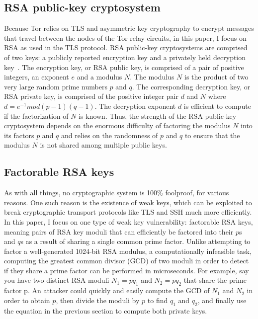 \subsection{RSA public-key cryptosystem}
Because Tor relies on TLS and asymmetric key cryptography to encrypt messages that travel between the nodes of the Tor relay circuits, in this paper, I focus on RSA as used in the TLS protocol. RSA public-key cryptosystems are comprised of two keys: a publicly reported encryption key and a privately held decryption key~\cite{rivest1978method}. The encryption key, or RSA public key, is comprised of a pair of positive integers, an exponent $e$ and a modulus $N$. The modulus $N$ is the product of two very large random prime numbers $p$ and $q$. The corresponding decryption key, or RSA private key, is comprised of the positive integer pair $d$ and $N$ where $d = e^{-1} mod (p - 1)(q - 1)$. The decryption exponent $d$ is efficient to compute if the factorization of $N$ is known. Thus, the strength of the RSA public-key cryptosystem depends on the enormous difficulty of factoring the modulus $N$ into its factors $p$ and $q$ and relies on the randomness of $p$ and $q$ to ensure that the modulus $N$ is not shared among multiple public keys.

\subsection{Factorable RSA keys}
As with all things, no cryptographic system is 100\% foolproof, for various reasons. One such reason is the existence of weak keys, which can be exploited to break cryptographic transport protocols like TLS and SSH much more efficiently. In this paper, I focus on one type of weak key vulnerability: factorable RSA keys, meaning pairs of RSA key moduli that can efficiently be factored into their $p$s and $q$s as a result of sharing a single common prime factor. Unlike attempting to factor a well-generated 1024-bit RSA modulus, a computationally infeasible task, computing the greatest common divisor (GCD) of two moduli in order to detect if they share a prime factor can be performed in microseconds. For example, say you have two distinct RSA moduli $N_1 = pq_1$ and $N_2 = pq_2$ that share the prime factor p. An attacker could quickly and easily compute the GCD of $N_1$ and $N_2$ in order to obtain $p$, then divide the moduli by $p$ to find $q_1$ and $q_2$, and finally use the equation in the previous section to compute both private keys.

